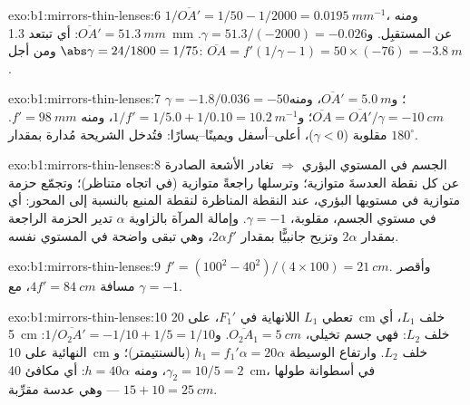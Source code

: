 \begin{solution}{exo:b1:mirrors-thin-lenses:6}
$1/\overline{OA'} = 1/50 - 1/2000 = \qty{0.0195}{mm^{-1}}$، ومنه
$\overline{OA'} = \qty{51.3}{mm}$: أي تبتعد  \qty{1.3}{mm} عن
المستقبِل. و$\gamma = 51.3/(-2000) = -0.026$. ومن أجل $\abs\gamma = 24/1800
= 1/75$: $\overline{OA} = f'(1/\gamma - 1) = 50 \times (-76) =
\qty{-3.8}{m}$.
\end{solution}

\begin{solution}{exo:b1:mirrors-thin-lenses:7}
$\gamma = -1.8/0.036 = -50$؛ و$\overline{OA'} = \qty{5.0}{m}$، ومنه
$\overline{OA} = \overline{OA'}/\gamma = \qty{-10}{cm}$؛
و$1/f' = 1/5.0 + 1/0.10 = \qty{10.2}{m^{-1}}$، ومنه $f' = \qty{98}{mm}$. 
مقلوبة ($\gamma < 0$)، أعلى--أسفل ويمينًا--يسارًا: فتُدخل الشريحة
مُدارة بمقدار $180^\circ$.
\end{solution}

\begin{solution}{exo:b1:mirrors-thin-lenses:8}
الجسم في المستوي البؤري $\Rightarrow$ تغادر الأشعة الصادرة عن كل نقطة
العدسةَ متوازية؛ وترسلها  راجعةً متوازية (في اتجاه
متناظر)؛ وتجمّع  حزمة متوازية في مستويها البؤري، عند
النقطة المناظرة لنقطة المنبع بالنسبة إلى المحور: أي  في مستوي
الجسم، مقلوبة، $\gamma = -1$. وإمالة المرآة بالزاوية $\alpha$ تدير
الحزمة الراجعة بمقدار $2\alpha$ وتزيح  جانبيًّا بمقدار
$2\alpha f'$، وهي تبقى واضحة في المستوي نفسه.
\end{solution}

\begin{solution}{exo:b1:mirrors-thin-lenses:9}
$f' = (100^2 - 40^2)/(4 \times 100) = \qty{21}{cm}$. وأقصر مسافة
$4f' = \qty{84}{cm}$، مع $\gamma = -1$.
\end{solution}

\begin{solution}{exo:b1:mirrors-thin-lenses:10}
تعطي $L_1$  اللانهاية في $F_1'$، على \qty{20}{cm} خلف $L_1$، أي \qty{5}{cm}
خلف $L_2$: فهي جسم تخيلي، $\overline{O_2A_1} = \qty{+5}{cm}$.
و$1/\overline{O_2A'} = -1/10 + 1/5 = 1/10$:  النهائية على \qty{10}{cm}
خلف $L_2$. وارتفاع  الوسيطة $h_1 = f_1'\alpha = 20\alpha$ (بالسنتيمتر)؛
و$\gamma_2 = 10/5 = 2$، ومنه $h = 40\alpha$: أي  مكافئ
\qty{40}{cm}، في أسطوانة طولها $15 + 10 = \qty{25}{cm}$ --- وهي عدسة مقرِّبة.
\end{solution}

